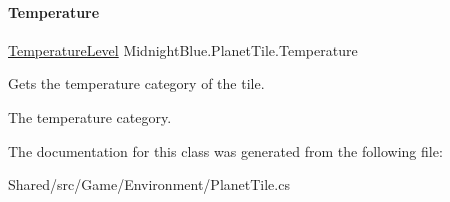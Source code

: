 \paragraph{\texorpdfstring{Temperature}{Temperature}}
{\footnotesize\ttfamily \hyperlink{namespace_midnight_blue_a6ea6484178cbe707f25d1a0ed56db7ab}{Temperature\+Level} Midnight\+Blue.\+Planet\+Tile.\+Temperature\hspace{0.3cm}{\ttfamily [get]}}



Gets the temperature category of the tile. 

The temperature category.

The documentation for this class was generated from the following file\+:\begin{DoxyCompactItemize}
\item 
Shared/src/\+Game/\+Environment/Planet\+Tile.\+cs\end{DoxyCompactItemize}
